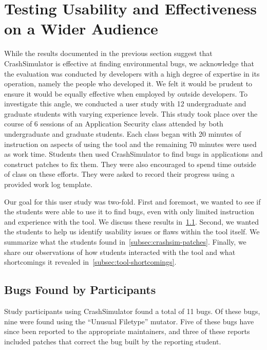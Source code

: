\section{Testing Usability and Effectiveness on a Wider Audience}

While the results documented in the previous section suggest that CrashSimulator
is effective at finding environmental bugs, we acknowledge that the evaluation
was conducted by developers with a high degree of expertise in its operation,
namely the people who developed it.  We felt it would be prudent to ensure it
would be equally effective when employed by outside developers.
To investigate this angle,
we conducted a user study
with 12 undergraduate and graduate students with varying experience levels.
This study took place over the course of 6  sessions
of an Application Security class attended by both undergraduate and graduate
students.  Each class began with 20
minutes of instruction on aspects of using the tool
and the remaining 70 minutes were used as work time. Students then used
CrashSimulator to find bugs in applications and construct patches to fix
them.  They were also encouraged to spend time outside
of class on these efforts.  They were asked to record their progress
using a provided work log template.



Our goal for this user study was two-fold.  First and foremost,
we wanted to see if the students were able to use it to find bugs,
even with only limited instruction and experience with the tool.
We discuss these results in~\ref{subsec:bugs-by-participants}.
Second, we wanted the students to help us identify usability issues
or flaws within the tool itself.  We summarize what the students found
in~\ref{subsec:crashsim-patches}.  Finally, we share our observations
of how students interacted with the tool and what shortcomings
it revealed in~\ref{subsec:tool-shortcomings}.

\subsection{Bugs Found by Participants}
\label{subsec:bugs-by-participants}
Study participants using CrashSimulator found a total of 11 bugs.
Of these bugs, nine were found using the ``Unusual Filetype'' mutator.
Five of these bugs have since been reported to the appropriate maintainers,
and three of these reports included patches
that correct the bug
built by the reporting student.

